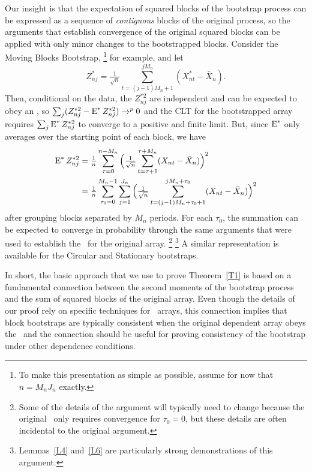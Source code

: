\documentclass[11pt]{article}
\begin{document}
Our insight is that the expectation of squared blocks of the bootstrap
process can be expressed as a sequence of \emph{contiguous} blocks of
the original process, so the arguments that establish convergence of
the original squared blocks can be applied with only minor changes to
the bootstrapped blocks. Consider the Moving Blocks Bootstrap,%
\footnote{To make this presentation as simple as possible, assume for
  now that $n = M_n J_n$ exactly.} %
for example, and let
\begin{equation*}
  Z_{nj}^* = \tfrac{1}{\sqrt{n}} \sum_{t=(j-1) M_n + 1}^{j M_n} (X_{nt}^* - \bar X_n).
\end{equation*}
Then, conditional on the data, the $Z_{nj}^{*2}$ are independent and can
be expected to obey an \lln, so %
$\sum_j (Z_{nj}^{*2} - \operatorname{E}^* Z_{nj}^{*2}) \to^p 0$ %
and the CLT for the bootstrapped array requires $\sum_j \operatorname{E}^*
Z_{nj}^{*2}$ to converge to a positive and finite limit.  But, since
$\operatorname{E}^*$ only averages over the starting point of each block, we have
\begin{align*}
  \operatorname{E}^* Z_{nj}^{*2} &=
  \tfrac{1}{n} \sum_{\tau = 0}^{n-M_n}
  \Big(\tfrac{1}{\sqrt{n}}
  \sum_{t= \tau + 1}^{\tau + M_n} (X_{nt} - \bar X_n) \Big)^2 \\
  &= \tfrac{1}{n} \sum_{\tau_0 = 0}^{M_n-1}
  \sum_{j=1}^{J_n}
  \Big(\tfrac{1}{\sqrt{n}}
  \sum_{t= (j - 1) M_n + \tau_0 + 1}^{j M_n + \tau_0} (X_{nt} - \bar X_n) \Big)^2
\end{align*}
after grouping blocks separated by $M_n$ periods. For each $\tau_0$,
the summation can be expected to converge in probability through the
same arguments that were used to establish the \clt\ for the original
array.%
\footnote{Some of the details of the argument will typically need to
  change because the original \clt\ only requires convergence for
  $\tau_0 = 0$, but these details are often incidental to the original
  argument.}%
\footnote{Lemmas~\ref{L4} and~\ref{L6} are particularly
  strong demonstrations of this argument.} %
A similar representation is available for the Circular and Stationary
bootstraps.

In short, the basic approach that we use to prove Theorem~\ref{T1}
is based on a fundamental connection between the second moments of the
bootstrap process and the sum of squared blocks of the original
array. Even though the details of our proof rely on specific
techniques for \ned\ arrays, this connection implies that block
bootstraps are typically consistent when the original dependent array
obeys the \clt\ and the connection should be useful for proving
consistency of the bootstrap under other dependence conditions.
\end{document}
